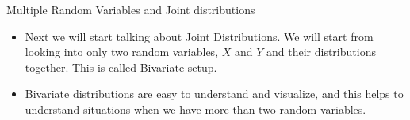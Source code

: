 \documentclass[8pt, usepdftitle = false]{beamer}
\begin{document}
\begin{frame}[allowframebreaks]{Multiple Random Variables and Joint distributions}
\begin{itemize}
\begin{itemize}
\begin{itemize}
      \item The household income of this family (this is a random variable $X_2$).

      \item The household expenditure of this family (this is a random variable $X_3$).
    \end{itemize}

   $X_1$, $X_2$ and $X_3$ are all random variables, and it is natural that they are all related to each other.

   \item 2. Two or more stock prices - Maybe we can represent a stock price of a company with $X_1$, and a stock price of another company with $X_2$, and often different stock prices move up and down together!


   \item We will see more examples in the coming section.
  \end{itemize}

  \item Next we will start talking about Joint Distributions. We will start from looking into only two random variables, $X$ and $Y$ and their distributions together. This is called \alert{Bivariate setup}. 

  \item Bivariate distributions are easy to understand and visualize, and this helps to understand situations when we have more than two random variables.
\end{itemize}




\end{frame}




\end{document}
